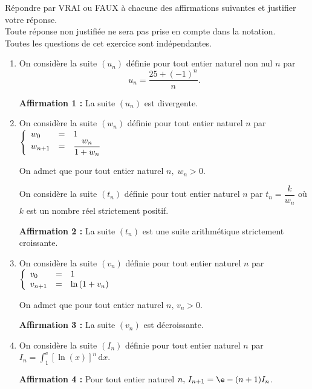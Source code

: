 \medskip

Répondre par VRAI ou FAUX à chacune des affirmations suivantes et justifier votre réponse.\\ Toute réponse non justifiée ne sera pas prise en compte dans la notation.\\
Toutes les questions de cet exercice sont indépendantes.

\medskip

\begin{enumerate}
\item On considère la suite $(u_n)$ définie pour tout entier naturel non nul $n$ par 
\[u_n = \dfrac{25 + (- 1)^n}{n}.\]

\textbf{Affirmation 1 :} La suite $(u_n)$ est divergente.
\item On considère la suite $(w_n)$ définie pour tout entier naturel $n$ par $\left\{\begin{array}{l c l}
w_0&=&1\\w_{n+1}&=&\dfrac{w_n}{1 + w_n}
\end{array}\right.$

On admet que pour tout entier naturel $n,\; w_n > 0$.

On considère la suite $(t_n)$ définie pour tout entier naturel $n$ par $t_n =\dfrac{k}{w_n}$ où $k$ est un nombre réel strictement positif.

\textbf{Affirmation 2 :} La suite $(t_n)$ est une suite arithmétique strictement croissante.

\item On considère la suite $(v_n)$ définie pour tout entier naturel $n$ par $\left\{\begin{array}{l c l}v_0&=&1\\
v_{n+1}&=&\ln \left(1 +  v_n\right)
\end{array}\right.$

On admet que pour tout entier naturel $n,\, v_n > 0$.

\textbf{Affirmation 3 :} La suite $(v_n)$ est décroissante.
\item On considère la suite $(I_n)$ définie pour tout entier naturel $n$ par $I_n = \displaystyle\int_1^{\text{e}} [\ln (x)]^n\,\text{d}x$.

\textbf{Affirmation 4 :} Pour tout entier naturel $n,\, I_{n+1} = \e - (n + 1) I_n$.
\end{enumerate}

\bigskip
